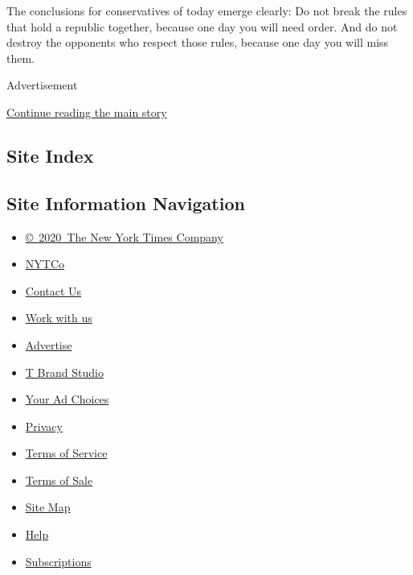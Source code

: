 The conclusions for conservatives of today emerge clearly: Do not break
the rules that hold a republic together, because one day you will need
order. And do not destroy the opponents who respect those rules, because
one day you will miss them.

Advertisement

\protect\hyperlink{after-bottom}{Continue reading the main story}

\hypertarget{site-index}{%
\subsection{Site Index}\label{site-index}}

\hypertarget{site-information-navigation}{%
\subsection{Site Information
Navigation}\label{site-information-navigation}}

\begin{itemize}
\tightlist
\item
  \href{https://help.nytimes.com/hc/en-us/articles/115014792127-Copyright-notice}{©~2020~The
  New York Times Company}
\end{itemize}

\begin{itemize}
\tightlist
\item
  \href{https://www.nytco.com/}{NYTCo}
\item
  \href{https://help.nytimes.com/hc/en-us/articles/115015385887-Contact-Us}{Contact
  Us}
\item
  \href{https://www.nytco.com/careers/}{Work with us}
\item
  \href{https://nytmediakit.com/}{Advertise}
\item
  \href{http://www.tbrandstudio.com/}{T Brand Studio}
\item
  \href{https://www.nytimes.com/privacy/cookie-policy\#how-do-i-manage-trackers}{Your
  Ad Choices}
\item
  \href{https://www.nytimes.com/privacy}{Privacy}
\item
  \href{https://help.nytimes.com/hc/en-us/articles/115014893428-Terms-of-service}{Terms
  of Service}
\item
  \href{https://help.nytimes.com/hc/en-us/articles/115014893968-Terms-of-sale}{Terms
  of Sale}
\item
  \href{https://spiderbites.nytimes.com}{Site Map}
\item
  \href{https://help.nytimes.com/hc/en-us}{Help}
\item
  \href{https://www.nytimes.com/subscription?campaignId=37WXW}{Subscriptions}
\end{itemize}
